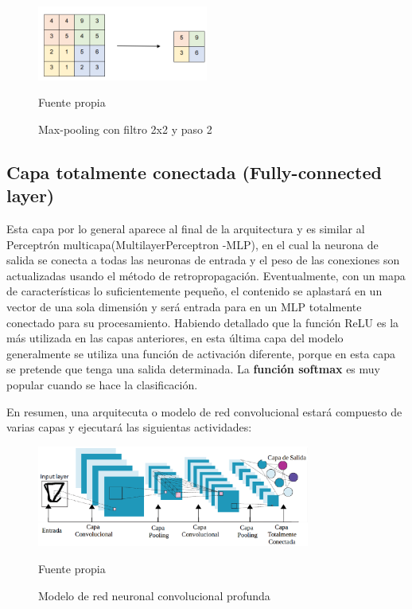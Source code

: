 		\begin{figure}[H]
		\begin{center}
		\includegraphics[width=0.5\textwidth]{images/marcoteorico/pool4}
		\end{center}
		\begin{center}
		\caption{\small{Max-pooling con filtro 2x2 y paso 2}}
		{\small{Fuente propia}}
		\end{center}
		\vspace{-1.5em}
		\end{figure}

	\subsection{Capa totalmente conectada (Fully-connected layer)}

		Esta capa por lo general aparece al final de la arquitectura y es similar al Perceptrón multicapa(MultilayerPerceptron -MLP), en el cual la neurona de salida se conecta a todas las neuronas de entrada y el peso de las conexiones son actualizadas usando el método de retropropagación.
		\vskip 0.4cm  
		Eventualmente, con un mapa de características lo suficientemente pequeño, el contenido se aplastará en un vector de una sola dimensión y será entrada para en un MLP totalmente conectado para su procesamiento.
		\vskip 0.4cm  
		Habiendo detallado que la función ReLU es la más utilizada en las capas anteriores, en esta última capa del modelo generalmente se utiliza una función de activación diferente, porque en esta capa se pretende que tenga una salida determinada. La {\bf función softmax} es muy popular cuando se hace la clasificación.
	


En resumen, una arquitecuta o modelo de red convolucional estará compuesto de varias capas y ejecutará las siguientas actividades:
\begin{figure}[H]
	\begin{center}
	\includegraphics[width=0.8\textwidth]{images/marcoteorico/modelo}
	\end{center}
	\begin{center}
	\caption{\small{Modelo de red neuronal convolucional profunda}}
	{\small{Fuente propia}}
	\end{center}
	\vspace{-1.5em}
	\end{figure}

